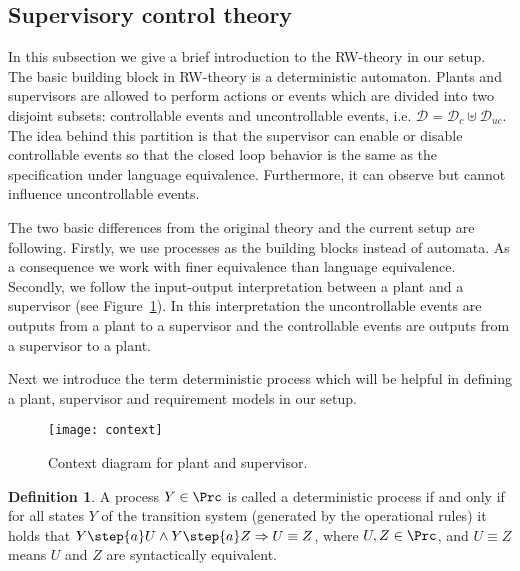 \documentclass[a4paper,english,final]{article}
\theoremstyle{plain}
\theoremstyle{definition}
\newtheorem{definition}[theorem]{Definition}
\newcommand{\data}{\ensuremath{\mathcal{D}}}
\begin{document}
\subsection{Supervisory control theory}\label{rwtheory}
In this subsection we give a brief introduction to the RW-theory in our setup. The basic building block in RW-theory is a deterministic automaton. Plants and supervisors are allowed to perform actions or events which are divided into two disjoint subsets: controllable events and uncontrollable events, i.e. $\data=\data_c\uplus\data_{uc}$. The idea behind this partition is that the supervisor can enable or disable controllable events so that the closed loop behavior is the same as the specification under language equivalence. Furthermore, it can observe but cannot influence uncontrollable events.

The two basic differences from the original theory and the current setup are following. Firstly, we use processes as the building blocks instead of automata. As a consequence we work with finer equivalence than language equivalence. Secondly, we follow the input-output interpretation \cite{balemiphdt} between a plant and a supervisor (see Figure~\ref{context}). In this interpretation the uncontrollable events are outputs from a plant to a supervisor and the controllable events are outputs from a supervisor to a plant.

Next we introduce the term deterministic process which will be helpful in defining a plant, supervisor and requirement models in our setup.
\begin{figure}
\centering
  \texttt{[image: context]}\\
  \caption{Context diagram for plant and supervisor.}\label{context}
\end{figure}

\begin{definition}
A process $Y\in\Prc$ is called a deterministic process \citep{acpbook} if and only if for all states $Y$ of the transition system (generated by the operational rules) it holds that $Y\step{a}U \wedge Y\step{a}Z \Rightarrow U\equiv Z$, where $U,Z\in\Prc$, and $U\equiv Z$ means $U$ and $Z$ are syntactically equivalent.
\end{definition}
\end{document}
